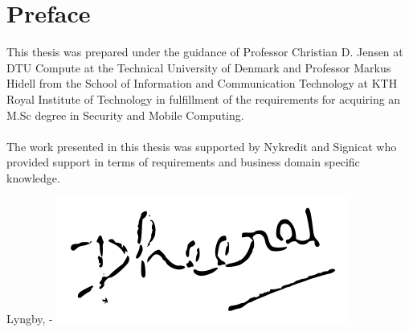 \chapter{Preface}

This thesis was prepared under the guidance of Professor Christian D. Jensen at DTU Compute at the Technical University of Denmark and Professor Markus Hidell from the School of Information and Communication Technology at KTH Royal Institute of Technology in fulfillment of the requirements for acquiring an M.Sc degree in Security and Mobile Computing.
\\\\The work presented in this thesis was supported by Nykredit and Signicat who provided support in terms of requirements and business domain specific knowledge.

\vspace{20mm}
\begin{center}
    \hspace{20mm} Lyngby, \thesishandin-\thesisyear
    \vspace{5mm}
    \newline
    \includegraphics[scale=0.5]{figures/Signature}
\end{center}
\begin{flushright}
    \thesisauthor
\end{flushright}
